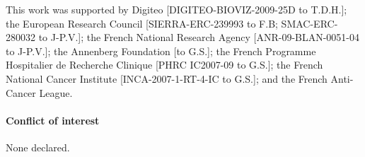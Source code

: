 \documentclass{bioinfo}
\begin{document}

This work was supported by Digiteo [DIGITEO-BIOVIZ-2009-25D to
T.D.H.]; the European Research Council [SIERRA-ERC-239993 to F.B; SMAC-ERC-280032 to J-P.V.];
the French National Research Agency [ANR-09-BLAN-0051-04 to J-P.V.]; the Annenberg Foundation [to G.S.];
the French Programme Hospitalier de Recherche Clinique [PHRC IC2007-09
to G.S.]; the French National Cancer Institute [INCA-2007-1-RT-4-IC to
G.S.]; and the French Anti-Cancer League.

 
%
%
%
%
%



\paragraph{Conflict of interest\textcolon} None declared.

\newpage
 


\end{document}
